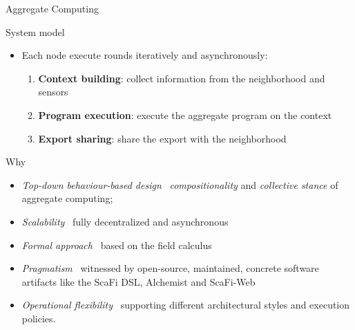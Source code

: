 \documentclass[presentation, 9pt]{beamer}\mode<presentation>{\usetheme{AMSBolognaFC}}
\begin{document}
\begin{frame}[allowframebreaks]{Aggregate Computing}
\begin{alertblock}{System model}
\begin{itemize}
		\item Each node execute rounds iteratively and asynchronously:
		\begin{enumerate}
			\item \textbf{Context building}: collect information from the neighborhood and sensors
			\item \textbf{Program execution}: execute the aggregate program on the context
			\item \textbf{Export sharing}: share the export with the neighborhood
		\end{enumerate}
	\end{itemize}
\end{alertblock}
\begin{block}{Why}
\begin{itemize}
	\item \emph{Top-down behaviour-based design} \faArrowRight \, \emph{compositionality} and \emph{collective stance} of aggregate computing;
	\item \emph{Scalability} \faArrowRight \, fully decentralized and asynchronous
	\item \emph{Formal approach} \faArrowRight \, based on the field calculus
		
	\item \emph{Pragmatism} \faArrowRight \, witnessed by open-source, maintained, concrete software artifacts like the ScaFi DSL, Alchemist and {\sc{}ScaFi-Web}
	\item \emph{Operational flexibility} \faArrowRight \, supporting different architectural styles and execution policies.
\end{itemize}

\end{block}

\end{frame}
\end{document}
